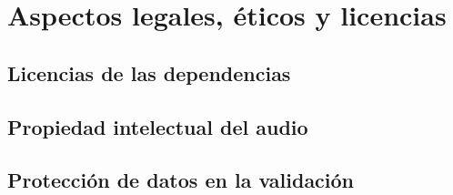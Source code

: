 
\chapter{Aspectos legales, éticos y licencias}
\label{cha:aspectos-legales}

\section{Licencias de las dependencias}
\label{sec:leg-licencias}


\section{Propiedad intelectual del audio}
\label{sec:leg-audio}


\section{Protección de datos en la validación}
\label{sec:leg-datos}



